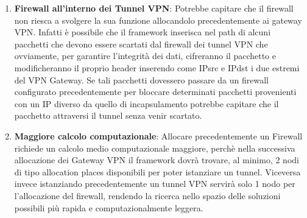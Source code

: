 \begin{enumerate}
    \item \textbf{Firewall all'interno dei Tunnel VPN}: Potrebbe capitare che il firewall non riesca a svolgere la sua funzione allocandolo precedentemente ai gateway VPN. Infatti è possibile che il framework
        inserisca nel path di alcuni pacchetti che devono essere scartati dal firewall dei tunnel VPN che ovviamente, per garantire l'integrità dei dati, cifreranno il pacchetto e modificheranno il proprio header
        inserendo come IPsrc e IPdst i due estremi del VPN Gateway. Se tali pacchetti dovessero passare da un firewall configurato precedentemente per bloccare determinati pacchetti provenienti con un IP diverso da quello di incapsulamento 
        potrebbe capitare che il pacchetto attraversi il tunnel senza venir scartato.
    \item \textbf{Maggiore calcolo computazionale}: Allocare precedentemente un Firewall richiede un calcolo medio computazionale maggiore, perchè nella successiva allocazione dei Gateway VPN il framework dovrà trovare, al minimo, 2 nodi 
        di tipo allocation places disponibili per poter istanziare un tunnel. Viceversa invece istanziando precedentemente un tunnel VPN servirà solo 1 nodo per l'allocazione del firewall, rendendo la ricerca nello spazio delle soluzioni possibili
        più rapida e computazionalmente leggera.
\end{enumerate}


